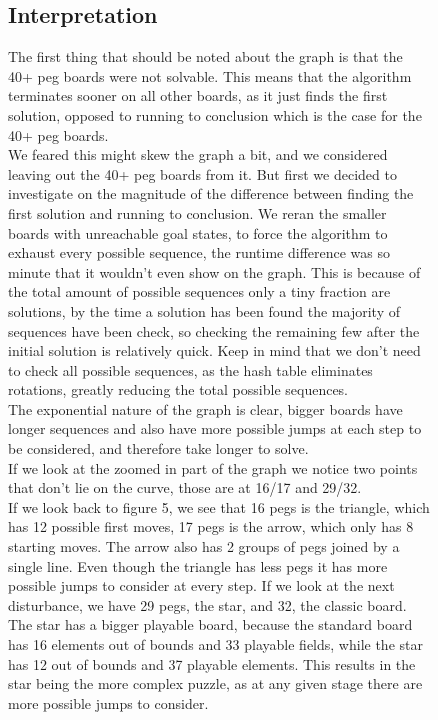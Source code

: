 \documentclass[11pt]{article}
\begin{document}
\begin{figure}
\subsection{Interpretation}
The first thing that should be noted about the graph is that the 40+ peg boards were not solvable. This means that the algorithm terminates sooner on all other boards, as it just finds the first solution, opposed to running to conclusion which is the case for the 40+ peg boards.\\
We feared this might skew the graph a bit, and we considered leaving out the 40+ peg boards from it. But first we decided to investigate on the magnitude of the difference between finding the first solution and running to conclusion. We reran the smaller boards with unreachable goal states, to force the algorithm to exhaust every possible sequence, the runtime difference was so minute that it wouldn't even show on the graph. This is because of the total amount of possible sequences only a tiny fraction are solutions, by the time a solution has been found the majority of sequences have been check, so checking the remaining few after the initial solution is relatively quick. Keep in mind that we don't need to check all possible sequences, as the hash table eliminates rotations, greatly reducing the total possible sequences.\\
The exponential nature of the graph is clear, bigger boards have longer sequences and also have more possible jumps at each step to be considered, and therefore take longer to solve.\\
If we look at the zoomed in part of the graph we notice two points that don't lie on the curve, those are at 16/17 and 29/32.\\
If we look back to figure 5, we see that 16 pegs is the triangle, which has 12 possible first moves, 17 pegs is the arrow, which only has 8 starting moves. The arrow also has 2 groups of pegs joined by a single line. Even though the triangle has less pegs it has more possible jumps to consider at every step.\newline
If we look at the next disturbance, we have 29 pegs, the star, and 32, the classic board. The star has a bigger playable board, because the standard board has 16 elements out of bounds and 33 playable fields, while the star has 12 out of bounds and 37 playable elements. This results in the star being the more complex puzzle, as at any given stage there are more possible jumps to consider.\\
\end{figure}
\end{document}

